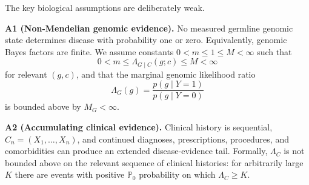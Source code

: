 \documentclass[journal]{IEEEtran}
\newcommand{\Pzero}{\mathbb{P}_0}
\newcommand{\LR}{\Lambda}
\begin{document}
The key biological assumptions are deliberately weak.

\textbf{A1 (Non-Mendelian genomic evidence).} No measured germline genomic state determines disease with probability one or zero. Equivalently, genomic Bayes factors are finite. We assume constants $0<m\le 1\le M<\infty$ such that
\begin{equation}
0<m\le \LR_{G\mid C}(g;c)\le M<\infty
\label{eq:boundedconditional}
\end{equation}
for relevant $(g,c)$, and that the marginal genomic likelihood ratio
\begin{equation}
\LR_G(g)=\frac{p(g\mid Y=1)}{p(g\mid Y=0)}
\end{equation}
is bounded above by $M_G<\infty$.

\textbf{A2 (Accumulating clinical evidence).} Clinical history is sequential, $C_n=(X_1,\ldots,X_n)$, and continued diagnoses, prescriptions, procedures, and comorbidities can produce an extended disease-evidence tail. Formally, $\LR_C$ is not bounded above on the relevant sequence of clinical histories: for arbitrarily large $K$ there are events with positive $\Pzero$ probability on which $\LR_C\ge K$.
\end{document}
